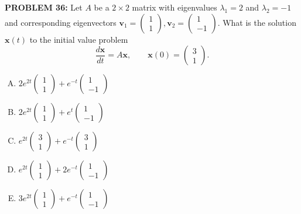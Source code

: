\documentclass[12pt]{amsart}
\begin{document}
{\bf PROBLEM 36:}
%
Let $A$ be a $2 \times 2$ matrix with eigenvalues $\lambda_1 = 2$ and $\lambda_2 = -1$ and corresponding eigenvectors
$\mathbf{v}_1 = \begin{pmatrix} 1 \\ 1 \end{pmatrix},  \mathbf{v}_2 = \begin{pmatrix} 1 \\ -1 \end{pmatrix}$.
What is the solution $\mathbf{x}(t)$ to the initial value problem
\[
\frac{d\mathbf{x}}{dt} = A\mathbf{x}, \qquad \mathbf{x}(0) = \begin{pmatrix} 3 \\ 1 \end{pmatrix}.
\]


\begin{enumerate}[(A)]
\item $2 e^{2t} \begin{pmatrix} 1 \\ 1 \end{pmatrix} + e^{-t} \begin{pmatrix} 1 \\ -1 \end{pmatrix}$
\item $2 e^{2t} \begin{pmatrix} 1 \\ 1 \end{pmatrix} + e^{t} \begin{pmatrix} 1 \\ -1 \end{pmatrix}$
\item $e^{2t} \begin{pmatrix} 3 \\ 1 \end{pmatrix} + e^{-t} \begin{pmatrix} 3 \\ 1 \end{pmatrix}$
\item $e^{2t} \begin{pmatrix} 1 \\ 1 \end{pmatrix} + 2 e^{-t} \begin{pmatrix} 1 \\ -1 \end{pmatrix}$
\item $3 e^{2t} \begin{pmatrix} 1 \\ 1 \end{pmatrix} + e^{-t} \begin{pmatrix} 1 \\ -1 \end{pmatrix}$
\end{enumerate}
\end{document}
